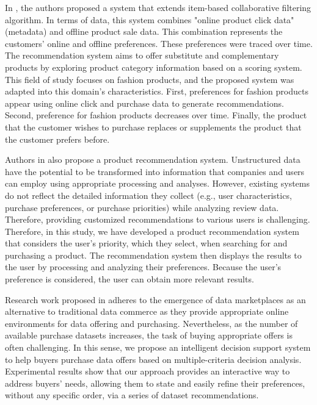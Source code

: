 \documentclass[preprint,3p,onecolumn]{elsarticle}
\begin{document}
\par In \citep{hwangbo2018recommendation}, the authors proposed a system that extends item-based collaborative filtering algorithm. In terms of data, this system combines "online product click data" (metadata) and offline product sale data. This combination represents the customers’ online and offline preferences. These preferences were traced over time. The recommendation system aims to offer substitute and complementary products by exploring product category information based on a scoring system. This field of study focuses on fashion products, and the proposed system was adapted into this domain’s characteristics. First, preferences for fashion products appear using online click and purchase data to generate recommendations. Second, preference for fashion products decreases over time. Finally, the product that the customer wishes to purchase replaces or supplements the product that the customer prefers before.
\par Authors in \citep{bang2020product} also propose a product recommendation system. Unstructured data have the potential to be transformed into information that companies and users can employ using appropriate processing and analyses. However, existing systems do not reflect the detailed information they collect (e.g., user characteristics, purchase preferences, or purchase priorities) while analyzing review data. Therefore, providing customized recommendations to various users is challenging. Therefore, in this study, we have developed a product recommendation system that considers the user’s priority, which they select, when searching for and purchasing a product. The recommendation system then displays the results to the user by processing and analyzing their preferences. Because the user's preference is considered, the user can obtain more relevant results.

\par Research work proposed in \citep{martins2017intelligent} adheres to the emergence of data marketplaces as an alternative to traditional data commerce as they provide appropriate online environments for data offering and purchasing. Nevertheless, as the number of available purchase datasets increases, the task of buying appropriate offers is often challenging. In this sense, we propose an intelligent decision support system to help buyers purchase data offers based on multiple-criteria decision analysis. Experimental results show that our approach provides an interactive way to address buyers’ needs, allowing them to state and easily refine their preferences, without any specific order, via a series of dataset recommendations.
\end{document}
